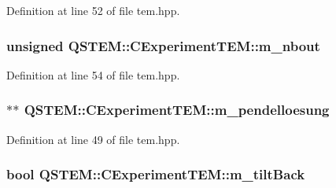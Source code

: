 Definition at line 52 of file tem.\-hpp.

\hypertarget{class_q_s_t_e_m_1_1_c_experiment_t_e_m_a51572d5f8a070f27f638f21cef35d4ba}{
\subsubsection[{m\-\_\-nbout}]{\setlength{\rightskip}{0pt plus 5cm}unsigned Q\-S\-T\-E\-M\-::\-C\-Experiment\-T\-E\-M\-::m\-\_\-nbout\hspace{0.3cm}{\ttfamily [protected]}}}\label{class_q_s_t_e_m_1_1_c_experiment_t_e_m_a51572d5f8a070f27f638f21cef35d4ba}


Definition at line 54 of file tem.\-hpp.

\hypertarget{class_q_s_t_e_m_1_1_c_experiment_t_e_m_a4a6f12a7b28398c2ab0875f7138bf731}{
\subsubsection[{m\-\_\-pendelloesung}]{$\ast$$\ast$ Q\-S\-T\-E\-M\-::\-C\-Experiment\-T\-E\-M\-::m\-\_\-pendelloesung\hspace{0.3cm}{\ttfamily [protected]}}}\label{class_q_s_t_e_m_1_1_c_experiment_t_e_m_a4a6f12a7b28398c2ab0875f7138bf731}


Definition at line 49 of file tem.\-hpp.

\hypertarget{class_q_s_t_e_m_1_1_c_experiment_t_e_m_a5c2f5087986b2b5b43b79b8bd5a2bebe}{
\subsubsection[{m\-\_\-tilt\-Back}]{\setlength{\rightskip}{0pt plus 5cm}bool Q\-S\-T\-E\-M\-::\-C\-Experiment\-T\-E\-M\-::m\-\_\-tilt\-Back\hspace{0.3cm}{\ttfamily [protected]}}}\label{class_q_s_t_e_m_1_1_c_experiment_t_e_m_a5c2f5087986b2b5b43b79b8bd5a2bebe}


